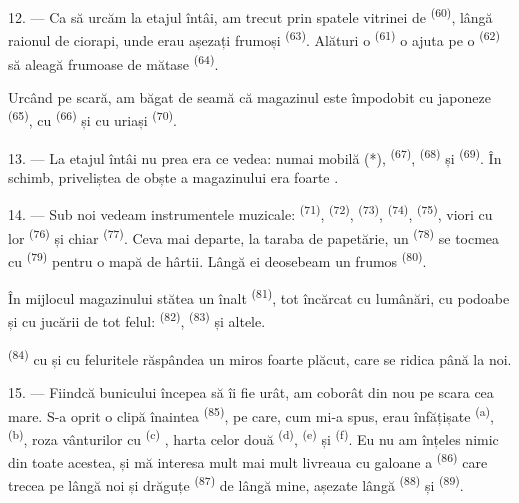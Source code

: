 12. --- Ca să urcăm la etajul întâi, am trecut prin spatele vitrinei de
 \textsuperscript{(60)}, lângă raionul de ciorapi, unde erau
așezați  frumoși \textsuperscript{(63)}. Alături o
 \textsuperscript{(61)} o ajuta pe o 
\textsuperscript{(62)} să aleagă  frumoase de mătase
\textsuperscript{(64)}.

Urcând pe scară, am băgat de seamă că magazinul este împodobit cu
 japoneze \textsuperscript{(65)}, cu 
\textsuperscript{(66)} și cu  uriași \textsuperscript{(70)}.

13. --- La etajul întâi nu prea era ce vedea: numai mobilă (*),  \textsuperscript{(67)},  \textsuperscript{(68)} și
 \textsuperscript{(69)}. În schimb, priveliștea de
obște a magazinului era foarte .

14. --- Sub noi vedeam instrumentele muzicale: 
\textsuperscript{(71)},  \textsuperscript{(72)},
 \textsuperscript{(73)}, 
\textsuperscript{(74)},  \textsuperscript{(75)}, viori cu
 lor \textsuperscript{(76)} și chiar 
\textsuperscript{(77)}. Ceva mai departe, la taraba de papetărie, un
 \textsuperscript{(78)} se tocmea cu 
\textsuperscript{(79)} pentru o mapă de hârtii. Lângă ei deosebeam un
 frumos \textsuperscript{(80)}.

În mijlocul magazinului stătea un  înalt
\textsuperscript{(81)}, tot încărcat cu lumânări, cu podoabe și cu jucării de tot
felul:  \textsuperscript{(82)}, 
\textsuperscript{(83)} și altele.

 \textsuperscript{(84)} cu  și
cu feluritele  răspândea un miros foarte plăcut, care se ridica
până la noi.

\VUsaut{3.4mm}
\VUsaut{2.8mm}

15. --- Fiindcă bunicului începea să îi fie urât, am coborât din nou pe scara cea
mare. S-a oprit o clipă înaintea 
\textsuperscript{(85)}, pe care, cum mi-a spus, erau înfățișate 
\textsuperscript{(a)}, 
\textsuperscript{(b)}, roza vânturilor cu 
\textsuperscript{(c)} , harta celor
două  \textsuperscript{(d)}, 
\textsuperscript{(e)} și  \textsuperscript{(f)}. Eu nu am
înțeles nimic din toate acestea, și mă interesa mult mai mult livreaua cu galoane a
 \textsuperscript{(86)} care trecea pe lângă noi și
 drăguțe \textsuperscript{(87)} de lângă mine, așezate lângă
 \textsuperscript{(88)} și 
\textsuperscript{(89)}.

